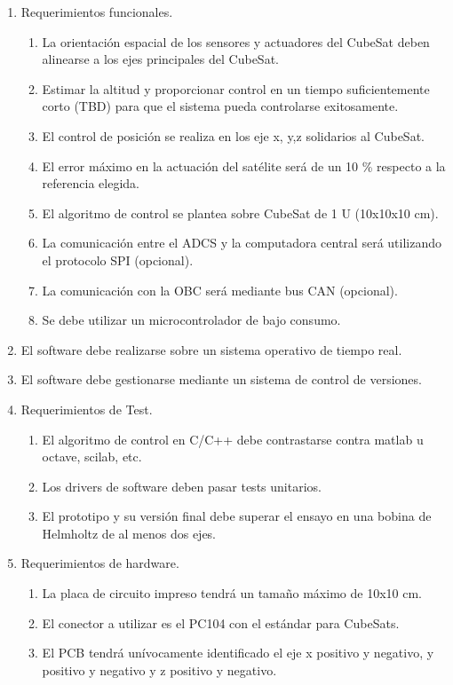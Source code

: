 \documentclass[
11pt, %
]{charter}
\begin{document}
\begin{enumerate}
	\item Requerimientos funcionales.
		\begin{enumerate}
			\item La orientación espacial de los sensores y actuadores del CubeSat deben alinearse a los ejes principales del CubeSat.
			\item  Estimar la altitud y proporcionar control en un tiempo suficientemente corto (TBD) para que el sistema pueda controlarse exitosamente. 
			\item El control de posición se realiza en los eje x, y,z solidarios al CubeSat.  
			\item El error máximo en la actuación del satélite será de un 10 \% respecto a la referencia elegida. 
			\item El algoritmo de control se plantea sobre CubeSat de 1 U (10x10x10 cm).
			\item La comunicación entre el ADCS y la computadora central será utilizando el protocolo SPI (opcional).  %
			\item La comunicación con la OBC será mediante bus CAN (opcional).  
			\item Se debe utilizar un microcontrolador de bajo consumo. 
		\end{enumerate}
	\item El software debe realizarse sobre un sistema operativo de tiempo real.   
	\item El software debe gestionarse mediante un sistema de control de versiones. 
	\item Requerimientos de Test.
		\begin{enumerate}
			\item  El algoritmo de control en C/C++ debe contrastarse contra matlab u octave, scilab, etc. 
			\item  Los drivers de software deben pasar tests unitarios. 
			\item  El prototipo y su versión final debe superar el ensayo en una bobina de Helmholtz de al menos dos ejes.  
		\end{enumerate}
\item Requerimientos de hardware.
	\begin{enumerate}
		\item La placa de circuito impreso tendrá un tamaño máximo de 10x10 cm.
		\item El conector a utilizar es el PC104 con el estándar para CubeSats. 
		\item El PCB tendrá unívocamente identificado el eje x positivo y negativo, y positivo y negativo y z positivo y negativo. 
	\end{enumerate}


\end{enumerate}
\end{document}
